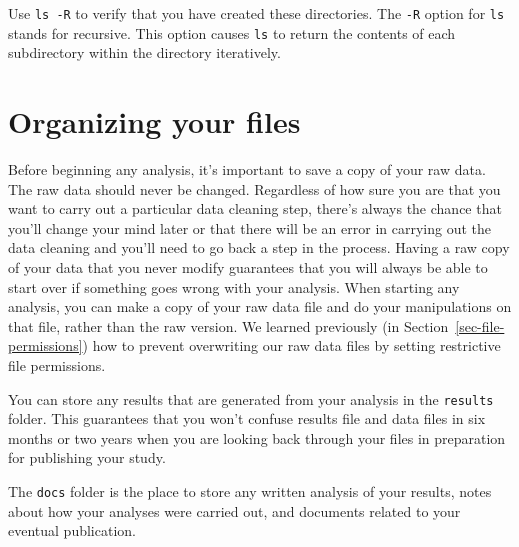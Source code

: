 \documentclass[
  letterpaper,
  DIV=11,
  numbers=noendperiod]{scrreprt}
\newenvironment{Shaded}{\begin{snugshade}}{\end{snugshade}}
\newcommand{\AttributeTok}[1]{\textcolor[rgb]{0.40,0.45,0.13}{#1}}
\newcommand{\ExtensionTok}[1]{\textcolor[rgb]{0.00,0.23,0.31}{#1}}
\newcommand{\NormalTok}[1]{\textcolor[rgb]{0.00,0.23,0.31}{#1}}
\begin{document}
Use \texttt{ls\ -R} to verify that you have created these directories.
The \texttt{-R} option for \texttt{ls} stands for recursive. This option
causes \texttt{ls} to return the contents of each subdirectory within
the directory iteratively.

\begin{Shaded}
\end{Shaded}

\section{Organizing your files}\label{organizing-your-files}

Before beginning any analysis, it's important to save a copy of your raw
data. The raw data should never be changed. Regardless of how sure you
are that you want to carry out a particular data cleaning step, there's
always the chance that you'll change your mind later or that there will
be an error in carrying out the data cleaning and you'll need to go back
a step in the process. Having a raw copy of your data that you never
modify guarantees that you will always be able to start over if
something goes wrong with your analysis. When starting any analysis, you
can make a copy of your raw data file and do your manipulations on that
file, rather than the raw version. We learned previously (in
Section~\ref{sec-file-permissions}) how to prevent overwriting our raw
data files by setting restrictive file permissions.

You can store any results that are generated from your analysis in the
\texttt{results} folder. This guarantees that you won't confuse results
file and data files in six months or two years when you are looking back
through your files in preparation for publishing your study.

The \texttt{docs} folder is the place to store any written analysis of
your results, notes about how your analyses were carried out, and
documents related to your eventual publication.
\end{document}
